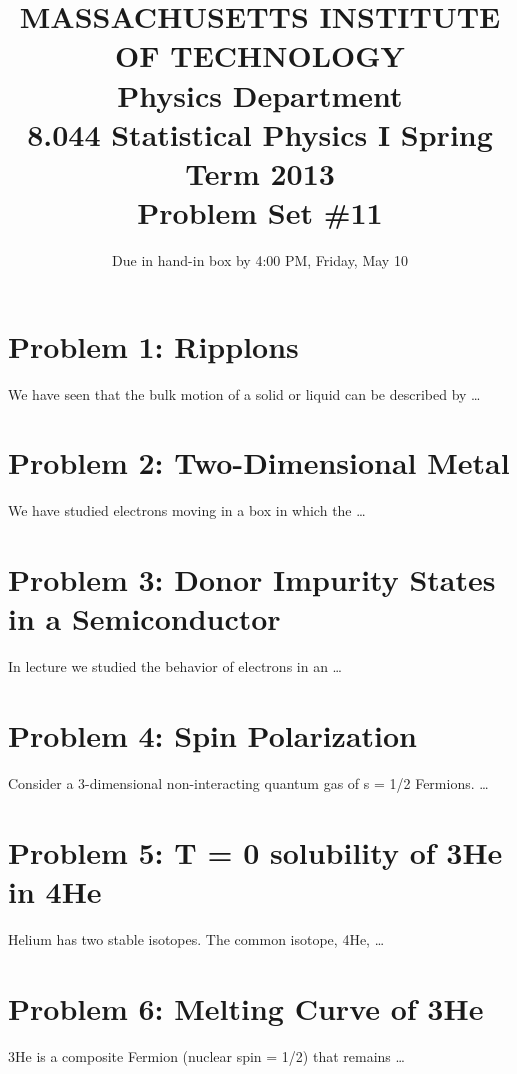 \documentclass{article}
\title{MASSACHUSETTS INSTITUTE OF TECHNOLOGY\\Physics Department\\8.044 Statistical Physics I Spring Term 2013\\Problem Set \#11}
\date{Due in hand-in box by 4:00 PM, Friday, May 10}
\begin{document}
\maketitle

\section*{Problem 1: Ripplons}
We have seen that the bulk motion of a solid or liquid can be described by \ldots

\section*{Problem 2: Two-Dimensional Metal}
We have studied electrons moving in a box in which the \ldots

\section*{Problem 3: Donor Impurity States in a Semiconductor}
In lecture we studied the behavior of electrons in an \ldots

\section*{Problem 4: Spin Polarization}
Consider a 3-dimensional non-interacting quantum gas of s = 1/2 Fermions. \ldots

\section*{Problem 5: T = 0 solubility of 3He in 4He}
Helium has two stable isotopes. The common isotope, 4He, \ldots

\section*{Problem 6: Melting Curve of 3He}
3He is a composite Fermion (nuclear spin = 1/2) that remains \ldots
\end{document}
